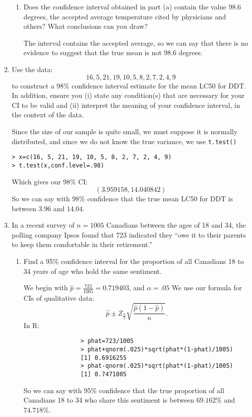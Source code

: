 \documentclass{article}
\begin{document}
\begin{enumerate}
\begin{enumerate}[label= (\alph*)]
\item Does the confidence interval obtained in part (a) contain the value 98.6 degrees, the accepted average temperature cited by physicians and others? What conclusions can you draw? 

    The interval contains the accepted average, so we can say that there is no evidence to suggest that the true mean is not 98.6 degrees.
\end{enumerate}

\item Use the data:
$$16, 5, 21, 19, 10, 5, 8, 2, 7, 2, 4, 9$$
to construct a 98\% confidence interval estimate for the mean LC50 for DDT. In addition, ensure you (i) state
any condition(s) that are necessary for your CI to be valid and (ii) interpret the meaning of your confidence
interval, in the context of the data. 

Since the size of our sample is quite small, we must suppose it is normally distributed, and since we do not know the true variance, we use \verb|t.test()|

\begin{verbatim}
> x=c(16, 5, 21, 19, 10, 5, 8, 2, 7, 2, 4, 9)
> t.test(x,conf.level=.98)
\end{verbatim}

Which gives our 98\% CI:
$$\left( 3.959158,14.040842 \right) $$
So we can say with 98\% confidence that the true mean LC50 for DDT is between $3.96$ and $14.04$.

\item In a recent survey of $n = 1005$ Canadians between the ages of 18 and 34, the polling company Ipsos found that 723 indicated they “owe it to their parents to keep them comfortable in their retirement.”
    \begin{enumerate}[label= (\alph*)] 
        \item  Find a 95\% confidence interval for the proportion of all Canadians 18 to 34
            years of age who hold the same sentiment. 

            We begin with $\hat{p}=\frac{723}{1005}=0.719403$, and $\alpha=.05$
            We use our formula for CIs of qualitative data:
            \[
               \hat{p}\pm Z_{\frac{\alpha}{2}}\sqrt{ \frac{\hat{p}(1-\hat{p})}{n}}
            .\] 
            In R:
            \begin{verbatim}
                > phat=723/1005
                > phat+qnorm(.025)*sqrt(phat*(1-phat)/1005)
                [1] 0.6916255
                > phat-qnorm(.025)*sqrt(phat*(1-phat)/1005)
                [1] 0.7471805
            \end{verbatim}
            So we can say with 95\% confidence that the true proportion of all Canadians 18 to 34 who
            share this sentiment is between $69.162\%$ and $74.718\%$.


\end{enumerate}
\end{enumerate}
\end{document}
